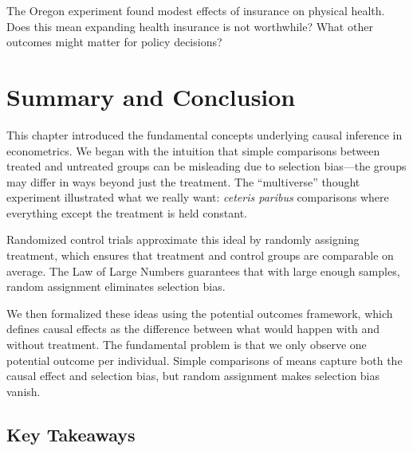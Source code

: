 \documentclass[
  letterpaper,
  DIV=11,
  numbers=noendperiod]{scrreprt}
\begin{document}
\begin{tcolorbox}[enhanced jigsaw, arc=.35mm, bottomrule=.15mm, bottomtitle=1mm, breakable, colback=white, colbacktitle=quarto-callout-tip-color!10!white, colframe=quarto-callout-tip-color-frame, coltitle=black, left=2mm, leftrule=.75mm, opacityback=0, opacitybacktitle=0.6, rightrule=.15mm, title=\textcolor{quarto-callout-tip-color}{\faLightbulb}\hspace{0.5em}{Discussion Question}, titlerule=0mm, toprule=.15mm, toptitle=1mm]

The Oregon experiment found modest effects of insurance on physical
health. Does this mean expanding health insurance is not worthwhile?
What other outcomes might matter for policy decisions?

\end{tcolorbox}

\section{Summary and Conclusion}\label{summary-and-conclusion-1}

This chapter introduced the fundamental concepts underlying causal
inference in econometrics. We began with the intuition that simple
comparisons between treated and untreated groups can be misleading due
to selection bias---the groups may differ in ways beyond just the
treatment. The ``multiverse'' thought experiment illustrated what we
really want: \emph{ceteris paribus} comparisons where everything except
the treatment is held constant.

Randomized control trials approximate this ideal by randomly assigning
treatment, which ensures that treatment and control groups are
comparable on average. The Law of Large Numbers guarantees that with
large enough samples, random assignment eliminates selection bias.

We then formalized these ideas using the potential outcomes framework,
which defines causal effects as the difference between what would happen
with and without treatment. The fundamental problem is that we only
observe one potential outcome per individual. Simple comparisons of
means capture both the causal effect and selection bias, but random
assignment makes selection bias vanish.

\subsection{Key Takeaways}\label{key-takeaways-1}
\end{document}
